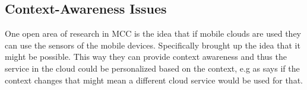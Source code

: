 \subsection{Context-Awareness Issues}
One open area of research in MCC is the idea that if mobile clouds are used they can use the sensors of the mobile devices. 
Specifically \citet{5557960} brought up the idea that it might be possible.
This way they can provide context awareness and thus the service in the cloud could be personalized based on the context, e.g as \citet{fernando2013mobile} says if the context changes that might mean a different cloud service would be used for that. 
\citep{sanaei2014heterogeneity}